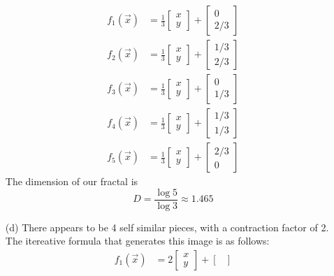 \documentclass[12pt]{article}
\begin{document}
\begin{itemize}
	\begin{align*}
		f_1(\vec{x}) &= \frac{1}{3} \begin{bmatrix}
			x \\
			y
		\end{bmatrix} + \begin{bmatrix}
			0 \\
			2/3
		\end{bmatrix} \\
		f_2(\vec{x}) &= \frac{1}{3} \begin{bmatrix}
			x \\
			y
		\end{bmatrix} + \begin{bmatrix}
			1/3 \\
			2/3
		\end{bmatrix} \\
		f_3(\vec{x}) &= \frac{1}{3} \begin{bmatrix}
			x \\
			y
		\end{bmatrix} + \begin{bmatrix}
			0 \\
			1/3
		\end{bmatrix} \\
		f_4(\vec{x}) &= \frac{1}{3} \begin{bmatrix}
			x \\
			y
		\end{bmatrix} + \begin{bmatrix}
			1/3 \\
			1/3
		\end{bmatrix} \\
		f_5(\vec{x}) &= \frac{1}{3} \begin{bmatrix}
			x \\
			y
		\end{bmatrix} + \begin{bmatrix}
			2/3 \\
			0
		\end{bmatrix}
	\end{align*}
	The dimension of our fractal is
	\[
		D = \frac{\log 5}{\log 3} \approx 1.465
	\]
	\item[(d)] There appears to be 4 self similar pieces, with a contraction factor of 2. The itereative formula that generates this image is as follows:
	\begin{align*}
		f_1(\vec{x}) &= 2 \begin{bmatrix}
			x \\
			y
		\end{bmatrix} + \begin{bmatrix}

\end{bmatrix}
\end{align*}
\end{itemize}
\end{document}
